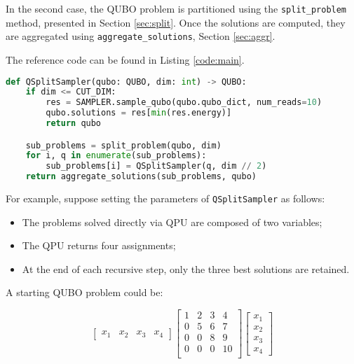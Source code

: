 In the second case, the QUBO problem is partitioned using the \texttt{split\_problem} method, presented in Section \ref{sec:split}. 
Once the solutions are computed, they are aggregated using \texttt{aggregate\_solutions}, Section \ref{sec:aggr}.

The reference code can be found in Listing \ref{code:main}.

\begin{lstlisting}[language=Python, caption=QSplitSampler main function, label=code:main]
def QSplitSampler(qubo: QUBO, dim: int) -> QUBO:
    if dim <= CUT_DIM:
        res = SAMPLER.sample_qubo(qubo.qubo_dict, num_reads=10)
        qubo.solutions = res[min(res.energy)]
        return qubo

    sub_problems = split_problem(qubo, dim)
    for i, q in enumerate(sub_problems):
        sub_problems[i] = QSplitSampler(q, dim // 2)
    return aggregate_solutions(sub_problems, qubo)
\end{lstlisting}

For example, suppose setting the parameters of \texttt{QSplitSampler} as follows:
\begin{itemize}
    \item The problems solved directly via QPU are composed of two variables;
    \item The QPU returns four assignments;
    \item At the end of each recursive step, only the three best solutions are retained.
\end{itemize}

A starting QUBO problem could be:

\begin{equation}
    \begin{bmatrix}
        x_1 & x_2 & x_3 & x_4
    \end{bmatrix}
    \begin{bmatrix}
        1 & 2 & 3 & 4 \\
        0 & 5 & 6 & 7 \\
        0 & 0 & 8 & 9 \\
        0 & 0 & 0 & 10 \\
    \end{bmatrix}
    \begin{bmatrix}
        x_1 \\
        x_2 \\
        x_3 \\
        x_4
    \end{bmatrix}
    \label{eq:example_full}
\end{equation}


